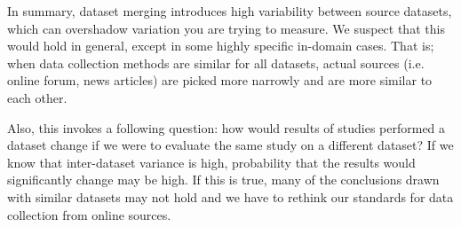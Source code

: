 \documentclass[fleqn,moreauthors,10pt]{ds_report}
\begin{document}
In summary, dataset merging introduces high variability between source datasets, which can overshadow variation you are trying to measure. We suspect that this would hold in general, except in some highly specific in-domain cases. That is; when data collection methods are similar for all datasets, actual sources (i.e. online forum, news articles) are picked more narrowly and are more similar to each other.

Also, this invokes a following question: how would results of studies performed a dataset change if we were to evaluate the same study on a different dataset? If we know that inter-dataset variance is high, probability that the results would significantly change may be high. If this is true, many of the conclusions drawn with similar datasets may not hold and we have to rethink our standards for data collection from online sources.
\end{document}
